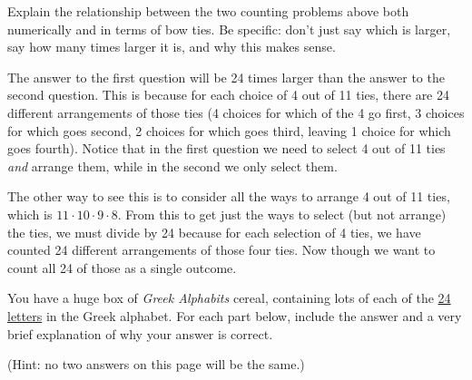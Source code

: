 \documentclass[11pt]{exam}
\begin{document}
\begin{questions}
  \question[8] Explain the relationship between the two counting problems above both numerically and in terms of bow ties.  Be specific: don't just say which is larger, say how many times larger it is, and why this makes sense.


  \begin{solution}
  The answer to the first question will be 24 times larger than the answer to the second question.  This is because for each choice of 4 out of 11 ties, there are 24 different arrangements of those ties (4 choices for which of the 4 go first, 3 choices for which goes second, 2 choices for which goes third, leaving 1 choice for which goes fourth).  Notice that in the first question we need to select 4 out of 11 ties {\em and} arrange them, while in the second we only select them.

  The other way to see this is to consider all the ways to arrange 4 out of 11 ties, which is $11\cdot 10\cdot 9 \cdot 8$.  From this to get just the ways to select (but not arrange) the ties, we must divide by 24 because for each selection of 4 ties, we have counted 24 different arrangements of those four ties.  Now though we want to count all 24 of those as a single outcome.
  \end{solution}

  \vfill


  \newpage

  \question[12] You have a huge box of {\em Greek Alphabits} cereal, containing lots of each of the \underline{24 letters} in the Greek alphabet.  For each part below, include the answer and a very brief explanation of why your answer is correct.

  (Hint: no two answers on this page will be the same.)
\end{questions}
\end{document}
